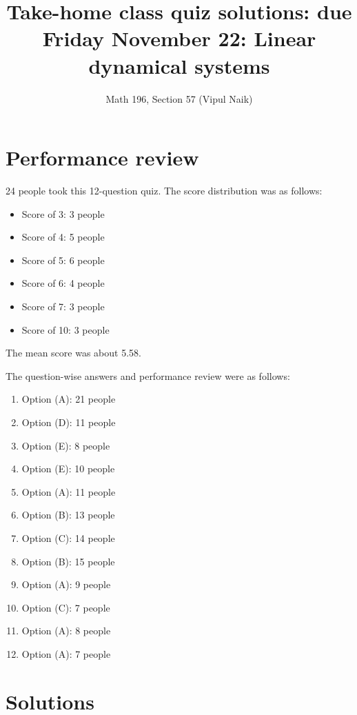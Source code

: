 \documentclass[10pt]{amsart}
\title{Take-home class quiz solutions: due Friday November 22: Linear dynamical systems}
\author{Math 196, Section 57 (Vipul Naik)}
\begin{document}
\maketitle

\section{Performance review}

24 people took this 12-question quiz. The score distribution was as follows:

\begin{itemize}
\item Score of 3: 3 people
\item Score of 4: 5 people
\item Score of 5: 6 people
\item Score of 6: 4 people
\item Score of 7: 3 people
\item Score of 10: 3 people
\end{itemize}

The mean score was about 5.58.

The question-wise answers and performance review were as follows:

\begin{enumerate}
\item Option (A): 21 people %
\item Option (D): 11 people %
\item Option (E): 8 people %
\item Option (E): 10 people %
\item Option (A): 11 people %
\item Option (B): 13 people %
\item Option (C): 14 people %
\item Option (B): 15 people %
\item Option (A): 9 people %
\item Option (C): 7 people %
\item Option (A): 8 people %
\item Option (A): 7 people %
\end{enumerate}

\section{Solutions}
\end{document}

